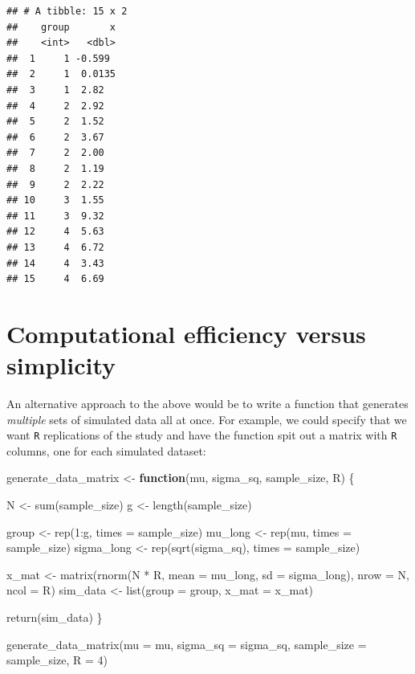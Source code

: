 \documentclass[
]{book}
\newenvironment{Shaded}{\begin{snugshade}}{\end{snugshade}}
\newcommand{\AttributeTok}[1]{\textcolor[rgb]{0.77,0.63,0.00}{#1}}
\newcommand{\ControlFlowTok}[1]{\textcolor[rgb]{0.13,0.29,0.53}{\textbf{#1}}}
\newcommand{\DecValTok}[1]{\textcolor[rgb]{0.00,0.00,0.81}{#1}}
\newcommand{\FunctionTok}[1]{\textcolor[rgb]{0.00,0.00,0.00}{#1}}
\newcommand{\NormalTok}[1]{#1}
\newcommand{\OtherTok}[1]{\textcolor[rgb]{0.56,0.35,0.01}{#1}}
\newcommand{\SpecialCharTok}[1]{\textcolor[rgb]{0.00,0.00,0.00}{#1}}
\begin{document}
\begin{verbatim}
## # A tibble: 15 x 2
##    group       x
##    <int>   <dbl>
##  1     1 -0.599 
##  2     1  0.0135
##  3     1  2.82  
##  4     2  2.92  
##  5     2  1.52  
##  6     2  3.67  
##  7     2  2.00  
##  8     2  1.19  
##  9     2  2.22  
## 10     3  1.55  
## 11     3  9.32  
## 12     4  5.63  
## 13     4  6.72  
## 14     4  3.43  
## 15     4  6.69
\end{verbatim}

\hypertarget{computational-efficiency-versus-simplicity}{%
\section{Computational efficiency versus simplicity}\label{computational-efficiency-versus-simplicity}}

An alternative approach to the above would be to write a function that generates \emph{multiple} sets of simulated data all at once. For example, we could specify that we want \texttt{R} replications of the study and have the function spit out a matrix with \texttt{R} columns, one for each simulated dataset:

\begin{Shaded}
\begin{Highlighting}[]
\NormalTok{generate\_data\_matrix }\OtherTok{\textless{}{-}} \ControlFlowTok{function}\NormalTok{(mu, sigma\_sq, sample\_size, R) \{}

\NormalTok{  N }\OtherTok{\textless{}{-}} \FunctionTok{sum}\NormalTok{(sample\_size) }
\NormalTok{  g }\OtherTok{\textless{}{-}} \FunctionTok{length}\NormalTok{(sample\_size) }
  
\NormalTok{  group }\OtherTok{\textless{}{-}} \FunctionTok{rep}\NormalTok{(}\DecValTok{1}\SpecialCharTok{:}\NormalTok{g, }\AttributeTok{times =}\NormalTok{ sample\_size) }
\NormalTok{  mu\_long }\OtherTok{\textless{}{-}} \FunctionTok{rep}\NormalTok{(mu, }\AttributeTok{times =}\NormalTok{ sample\_size)}
\NormalTok{  sigma\_long }\OtherTok{\textless{}{-}} \FunctionTok{rep}\NormalTok{(}\FunctionTok{sqrt}\NormalTok{(sigma\_sq), }\AttributeTok{times =}\NormalTok{ sample\_size) }

\NormalTok{  x\_mat }\OtherTok{\textless{}{-}} \FunctionTok{matrix}\NormalTok{(}\FunctionTok{rnorm}\NormalTok{(N }\SpecialCharTok{*}\NormalTok{ R, }\AttributeTok{mean =}\NormalTok{ mu\_long, }\AttributeTok{sd =}\NormalTok{ sigma\_long),}
                  \AttributeTok{nrow =}\NormalTok{ N, }\AttributeTok{ncol =}\NormalTok{ R)}
\NormalTok{  sim\_data }\OtherTok{\textless{}{-}} \FunctionTok{list}\NormalTok{(}\AttributeTok{group =}\NormalTok{ group, }\AttributeTok{x\_mat =}\NormalTok{ x\_mat)}
    
  \FunctionTok{return}\NormalTok{(sim\_data)}
\NormalTok{\}}

\FunctionTok{generate\_data\_matrix}\NormalTok{(}\AttributeTok{mu =}\NormalTok{ mu, }\AttributeTok{sigma\_sq =}\NormalTok{ sigma\_sq,}
                     \AttributeTok{sample\_size =}\NormalTok{ sample\_size, }\AttributeTok{R =} \DecValTok{4}\NormalTok{)}
\end{Highlighting}
\end{Shaded}
\end{document}
